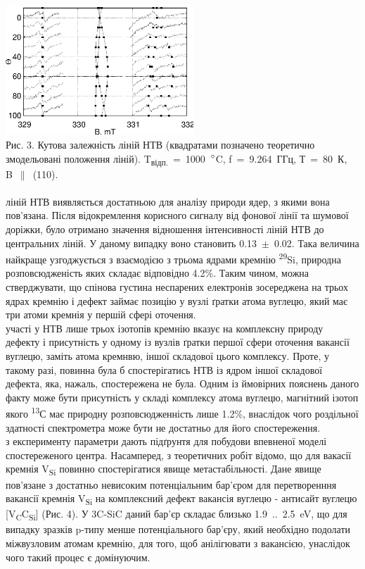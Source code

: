 \\
\includegraphics[width=200pt]{images/g3.eps}\mbox{}\\
\small Рис. 3. Кутова залежність ліній НТВ (квадратами позначено теоретично змодельовані положення ліній). T\textsubscript{відп.}~=~1000~$\degree$C, f~=~9.264~ГГц, Т~=~80~К, B~$\parallel$~(110).\\
\\
\normalsize
{} ліній НТВ виявляється достатньою для аналізу природи ядер, з якими вона пов'язана. Після відокремлення корисного сигналу від фонової лінії та шумової доріжки, було отримано значення відношення інтенсивності ліній НТВ до центральних ліній. У даному випадку воно становить 0.13~$\pm$~0.02. Така величина найкраще узгоджується з взаємодією з трьома ядрами кремнію \textsuperscript{29}Si, природна розповсюдженість яких складає відповідно 4.2\%. Таким чином, можна стверджувати, що спінова густина неспарених електронів зосереджена на трьох ядрах кремнію і дефект займає позицію у вузлі ґратки атома вуглецю, який має три атоми кремнія у першій сфері оточення.\\
 участі у НТВ лише трьох ізотопів кремнію вказує на комплексну природу дефекту і присутність у одному із вузлів ґратки першої сфери оточення вакансії вуглецю, заміть атома кремнвю, іншої складової цього комплексу. Проте, у такому разі, повинна була б спостерігатись НТВ із ядром іншої складової дефекта, яка, нажаль, спостережена не була. Одним із ймовірних пояснень даного факту може бути присутність у складі комплексу атома вуглецю, магнітний ізотоп якого \textsuperscript{13}С має природну розповсюдженність лише 1.2\%, внаслідок чого роздільної здатності спектрометра може бути не достатньо для його спостереження.\\
 з експерименту параметри дають підґрунтя для побудови впевненої моделі спостереженого центра. Насамперед, з теоретичних робіт \citep{met1,met2,met3,met4} відомо, що для вакасії кремнія V\textsubscript{Si} повинно спостерігатися явище метастабільності. Дане явище пов'язане з достатньо невисоким потенціальним бар'єром для перетворенння вакансії кремнія V\textsubscript{Si} на комплексний дефект вакансія вуглецю - антисайт вуглецю [V\textsubscript{C}C\textsubscript{Si}] (Рис. 4). У 3C-SiC даний бар'єр складає близько 1.9~..~2.5~eV, що для випадку зразків p-типу менше потенціального бар'єру, який необхідно подолати міжвузловим атомам кремнію, для того, щоб анілігювати з вакансією, унаслідок чого такий процес є домінуючим.\\
